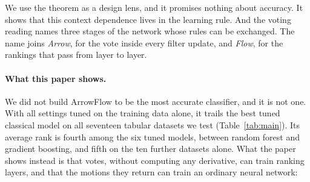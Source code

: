 We use the theorem as a design lens, and it promises nothing about accuracy. It shows that this context dependence lives in the learning rule. And the voting reading names three stages of the network whose rules can be exchanged. The name joins \emph{Arrow}, for the vote inside every filter update, and \emph{Flow}, for the rankings that pass from layer to layer.

\paragraph{What this paper shows.} We did not build ArrowFlow to be the most accurate classifier, and it is not one. With all settings tuned on the training data alone, it trails the best tuned classical model on all seventeen tabular datasets we test (Table~\ref{tab:main}). Its average rank is fourth among the six tuned models, between random forest and gradient boosting, and fifth on the ten further datasets alone. What the paper shows instead is that votes, without computing any derivative, can train ranking layers, and that the motions they return can train an ordinary neural network:
